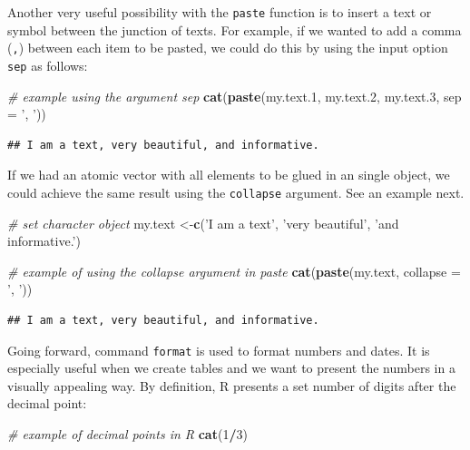 \documentclass[11pt,]{book}
\newenvironment{Shaded}{\begin{snugshade}}{\end{snugshade}}
\newcommand{\KeywordTok}[1]{\textcolor[rgb]{0.27,0.27,0.27}{\textbf{#1}}}
\newcommand{\DataTypeTok}[1]{\textcolor[rgb]{0.27,0.27,0.27}{#1}}
\newcommand{\DecValTok}[1]{\textcolor[rgb]{0.06,0.06,0.06}{#1}}
\newcommand{\StringTok}[1]{\textcolor[rgb]{0.5,0.5,0.5}{#1}}
\newcommand{\CommentTok}[1]{\textcolor[rgb]{0.56,0.35,0.01}{\textit{#1}}}
\newcommand{\OperatorTok}[1]{\textcolor[rgb]{0.81,0.36,0.00}{\textbf{#1}}}
\newcommand{\NormalTok}[1]{#1}
\begin{document}
Another very useful possibility with the \texttt{paste} function is to
insert a text or symbol between the junction of texts. For example, if
we wanted to add a comma (\texttt{,}) between each item to be pasted, we
could do this by using the input option \texttt{sep} as follows:

\begin{Shaded}
\begin{Highlighting}[]
\CommentTok{# example using the argument sep}
\KeywordTok{cat}\NormalTok{(}\KeywordTok{paste}\NormalTok{(my.text.}\DecValTok{1}\NormalTok{, my.text.}\DecValTok{2}\NormalTok{, my.text.}\DecValTok{3}\NormalTok{, }\DataTypeTok{sep =} \StringTok{', '}\NormalTok{)) }
\end{Highlighting}
\end{Shaded}

\begin{verbatim}
## I am a text, very beautiful, and informative.
\end{verbatim}

If we had an atomic vector with all elements to be glued in an single
object, we could achieve the same result using the \texttt{collapse}
argument. See an example next.

\begin{Shaded}
\begin{Highlighting}[]
\CommentTok{# set character object }
\NormalTok{my.text <-}\KeywordTok{c}\NormalTok{(}\StringTok{'I am a text'}\NormalTok{, }\StringTok{'very beautiful'}\NormalTok{, }\StringTok{'and informative.'}\NormalTok{)}

\CommentTok{# example of using the collapse argument in paste}
\KeywordTok{cat}\NormalTok{(}\KeywordTok{paste}\NormalTok{(my.text, }\DataTypeTok{collapse =} \StringTok{', '}\NormalTok{)) }
\end{Highlighting}
\end{Shaded}

\begin{verbatim}
## I am a text, very beautiful, and informative.
\end{verbatim}

Going forward, command \texttt{format} is used to format numbers and
dates. It is especially useful when we create tables and we want to
present the numbers in a visually appealing way. By definition, R
presents a set number of digits after the decimal point:

\begin{Shaded}
\begin{Highlighting}[]
\CommentTok{# example of decimal points in R}
\KeywordTok{cat}\NormalTok{(}\DecValTok{1}\OperatorTok{/}\DecValTok{3}\NormalTok{)}
\end{Highlighting}
\end{Shaded}
\end{document}
